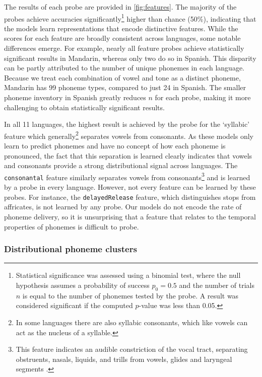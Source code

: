 The results of each probe are provided in \cref{fig:features}. The majority of the probes achieve accuracies significantly\footnote{Statistical significance was assessed using a binomial test, where the null hypothesis assumes a probability of success \( p_0 = 0.5 \) and the number of trials \( n \) is equal to the number of phonemes tested by the probe. A result was considered significant if the computed \( p \)-value was less than 0.05.} higher than chance (50\%), indicating that the models learn representations that encode distinctive features. While the scores for each feature are broadly consistent across languages, some notable differences emerge. For example, nearly all feature probes achieve statistically significant results in Mandarin, whereas only two do so in Spanish. This disparity can be partly attributed to the number of unique phonemes in each language. Because we treat each combination of vowel and tone as a distinct phoneme, Mandarin has 99 phoneme types, compared to just 24 in Spanish. The smaller phoneme inventory in Spanish greatly reduces $n$ for each probe, making it more challenging to obtain statistically significant results.

In all 11 languages, the highest result is achieved by the probe for the `syllabic' feature which generally\footnote{In some languages there are also syllabic consonants, which like vowels can act as the nucleus of a syllable.} separates vowels from consonants. As these models only learn to predict phonemes and have no concept of how each phoneme is pronounced, the fact that this separation is learned clearly indicates that vowels and consonants provide a strong distributional signal across languages. The \texttt{consonantal} feature similarly separates vowels from consonants\footnote{This feature indicates an audible constriction of the vocal tract, separating obstruents, nasals, liquids, and trills from vowels, glides and laryngeal segments \citep{gussenhoven2017understanding}.} and is learned by a probe in every language. However, not every feature can be learned by these probes. For instance, the \texttt{delayedRelease} feature, which distinguishes stops from affricates, is not learned by any probe. Our models do not encode the rate of phoneme delivery, so it is unsurprising that a feature that relates to the temporal properties of phonemes is difficult to probe.

\subsubsection*{Distributional phoneme clusters}

